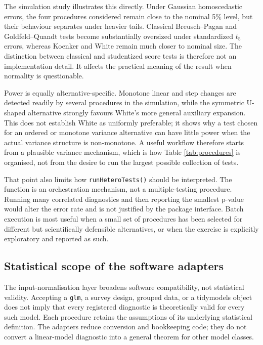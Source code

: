 The simulation study illustrates this directly. Under Gaussian homoscedastic
errors, the four procedures considered remain close to the nominal 5\% level,
but their behaviour separates under heavier tails. Classical Breusch--Pagan and
Goldfeld--Quandt tests become substantially oversized under standardized
\(t_5\) errors, whereas Koenker and White remain much closer to nominal size.
The distinction between classical and studentized score tests is therefore not
an implementation detail. It affects the practical meaning of the result when
normality is questionable.

Power is equally alternative-specific. Monotone linear and step changes are
detected readily by several procedures in the simulation, while the symmetric
U-shaped alternative strongly favours White's more general auxiliary expansion.
This does not establish White as uniformly preferable; it shows why a test
chosen for an ordered or monotone variance alternative can have little power
when the actual variance structure is non-monotone. A useful workflow therefore
starts from a plausible variance mechanism, which is how Table
\ref{tab:procedures} is organised, not from the desire to run the largest
possible collection of tests.

That point also limits how \texttt{runHeteroTests()} should be interpreted. The
function is an orchestration mechanism, not a multiple-testing procedure.
Running many correlated diagnostics and then reporting the smallest p-value
would alter the error rate and is not justified by the package interface. Batch
execution is most useful when a small set of procedures has been selected for
different but scientifically defensible alternatives, or when the exercise is
explicitly exploratory and reported as such.

\subsection{Statistical scope of the software adapters}\label{statistical-scope-of-the-software-adapters}

The input-normalisation layer broadens software compatibility, not statistical
validity. Accepting a \texttt{glm}, a survey design, grouped data, or a tidymodels
object does not imply that every registered diagnostic is theoretically valid
for every such model. Each procedure retains the assumptions of its underlying
statistical definition. The adapters reduce conversion and bookkeeping code;
they do not convert a linear-model diagnostic into a general theorem for other
model classes.

